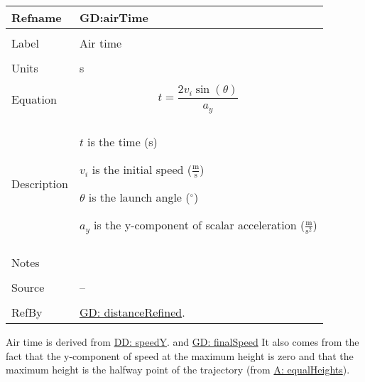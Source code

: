 \documentclass[12pt]{article}
\begin{document}
\noindent \begin{minipage}{\textwidth}
\begin{tabular}{p{} p{}}
\toprule \textbf{Refname} & \textbf{GD:airTime}
\label{GD:airTime}
\\ \midrule \\
Label & Air time
\\ \midrule \\
Units & s
\\ \midrule \\
Equation & \begin{displaymath}
           t=\frac{2 {v_{i}} \sin\left(θ\right)}{{a_{y}}}
           \end{displaymath}
\\ \midrule \\
Description & \begin{symbDescription}
              \item{$t$ is the time (s)}
              \item{${v_{i}}$ is the initial speed ($\frac{\text{m}}{\text{s}}$)}
              \item{$θ$ is the launch angle (${}^{\circ}$)}
              \item{${a_{y}}$ is the y-component of scalar acceleration ($\frac{\text{m}}{\text{s}^{2}}$)}
              \end{symbDescription}
\\ \midrule \\
Notes & 
\\ \midrule \\
Source & --
\\ \midrule \\
RefBy & \hyperref[GD:distanceRefined]{GD: distanceRefined}.
\\ \bottomrule \end{tabular}
\end{minipage}
Air time is derived from \hyperref[DD:speedY]{DD: speedY}. and \hyperref[GD:finalSpeed]{GD: finalSpeed} It also comes from the fact that the y-component of speed at the maximum height is zero and that the maximum height is the halfway point of the trajectory (from \hyperref[equalHeights]{A: equalHeights}).
\par~
\end{document}
